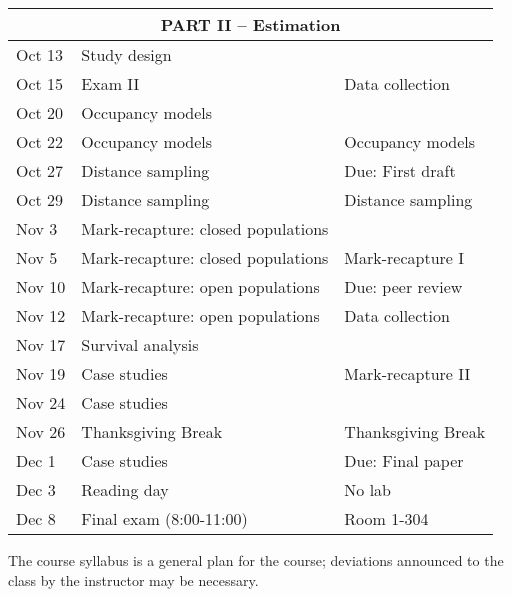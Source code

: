 \documentclass[12pt]{article}
\begin{document}
\begin{center}
\begin{tabular}[c]{lll}
\hline
           \multicolumn{3}{c}{PART II -- Estimation}                                   \\
\hline
Oct 13     & Study design                       &                                      \\
Oct 15     & Exam II                            & Data collection                      \\
\hline
Oct 20     & Occupancy models                   &                                      \\
Oct 22     & Occupancy models                   & Occupancy models                     \\
\hline
Oct 27     & Distance sampling                  & Due: First draft                     \\
Oct 29     & Distance sampling                  & Distance sampling                    \\
\hline
Nov 3      & Mark-recapture: closed populations &                                      \\
Nov 5      & Mark-recapture: closed populations & Mark-recapture I                     \\
\hline
Nov 10     & Mark-recapture: open populations   & Due: peer review                     \\
Nov 12     & Mark-recapture: open populations   & Data collection                      \\
\hline
Nov 17     & Survival analysis                  &                                      \\
Nov 19     & Case studies                       & Mark-recapture II                   \\
\hline
Nov 24     & Case studies                       &                                      \\
Nov 26     & Thanksgiving Break                 & Thanksgiving Break                    \\
\hline
Dec 1      & Case studies                       & Due: Final paper                     \\
Dec 3      & Reading day                        & No lab                               \\
\hline
Dec 8     & Final exam (8:00-11:00)            &  Room 1-304                                 \\
\hline \hline
\end{tabular}
\end{center}

The course syllabus is a general plan for the course; deviations announced to the class by the instructor may be necessary.
\end{document}
